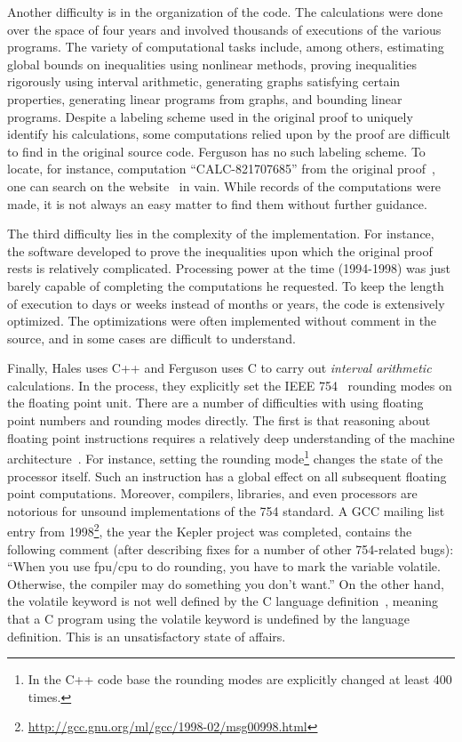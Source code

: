 \documentclass[11pt]{amsart}
\begin{document}
Another difficulty is in the organization of the code. The
calculations were done over the space of four years and involved %
thousands of executions of the various programs. The variety of
computational tasks include, among others, estimating global bounds on
inequalities using nonlinear methods, proving inequalities rigorously
using interval arithmetic, generating graphs satisfying certain
properties, generating linear programs from graphs, and bounding
linear programs. Despite a labeling scheme used in the original proof 
to uniquely
identify his calculations, some computations relied upon by the proof
are difficult to find in the original source code. 
Ferguson has no such labeling scheme.  To locate, for
instance, computation ``CALC-821707685'' from the original proof~\cite[p.159]{Hales:2006:DCG}, one can search on the website~\cite{website:Hales:1998:Code} in
vain.  While records
of the computations were made, it is not always an easy matter
to find them without further guidance.

The third difficulty lies in the complexity of the implementation. For instance,
the software  developed to prove the inequalities upon which the original
proof rests is relatively complicated. Processing power at the time
(1994-1998) was just barely capable of completing the computations he
requested. To keep the length of execution to days or weeks instead of
months or years, the code is extensively optimized. The
optimizations were often implemented without comment in the source,
and in some cases are difficult to understand.  

Finally, Hales uses C++ and Ferguson uses C to carry out
\emph{interval arithmetic} calculations. In the process, they
explicitly set the IEEE 754~\cite{IEEE:1985:IEE754} rounding modes on
the floating point unit. There are a number of difficulties with using
floating point numbers and rounding modes directly. The first is that
reasoning about floating point instructions requires a relatively deep
understanding of the machine architecture~\cite{Monniaux:2008:TOPLAS}.
For instance, setting the rounding mode\footnote{In the C++ code
base the rounding modes are explicitly changed at least 400 times.}
changes the state of the processor itself. Such an instruction has a
global effect on all subsequent floating point computations. Moreover,
compilers, libraries, and even processors are notorious for unsound
implementations of the 754 standard. A GCC mailing list entry from
1998\footnote{\url{http://gcc.gnu.org/ml/gcc/1998-02/msg00998.html}},
the year the Kepler project was completed, contains the following
comment (after describing fixes for a number of other 754-related
bugs): ``When you use fpu/cpu to do rounding, you have to mark the
variable volatile. Otherwise, the compiler may do something  you don't
want.'' On the other hand, the volatile keyword is not well defined by
the C language definition~\cite{Kernighan:1988:C}, meaning that a C
program using the volatile keyword is undefined by the
language definition. This is an unsatisfactory state of affairs.
\end{document}
